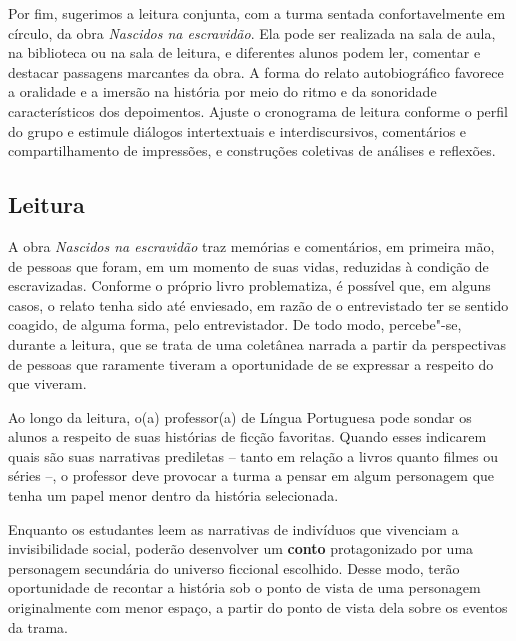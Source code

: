 \documentclass[11pt]{extarticle}
\begin{document}
Por fim, sugerimos a leitura conjunta, com a turma sentada
confortavelmente em círculo, da obra \emph{Nascidos na escravidão}. Ela
pode ser realizada na sala de aula, na biblioteca ou na sala de leitura,
e diferentes alunos podem ler, comentar e destacar passagens marcantes
da obra. A forma do relato autobiográfico favorece a oralidade e a
imersão na história por meio do ritmo e da sonoridade característicos
dos depoimentos. Ajuste o cronograma de leitura conforme o perfil do
grupo e estimule diálogos intertextuais e interdiscursivos, comentários
e compartilhamento de impressões, e construções coletivas de análises e
reflexões.

\subsection{Leitura}


A obra \emph{Nascidos na escravidão} traz memórias e
comentários, em primeira mão, de pessoas que foram, em um momento de
suas vidas, reduzidas à condição de escravizadas. Conforme o próprio
livro problematiza, é possível que, em alguns casos, o relato tenha sido
até enviesado, em razão de o entrevistado ter se sentido coagido, de
alguma forma, pelo entrevistador. De todo modo, percebe"-se, durante a
leitura, que se trata de uma coletânea narrada a partir da perspectivas
de pessoas que raramente tiveram a oportunidade de se expressar a
respeito do que viveram.


Ao longo da leitura, o(a) professor(a) de Língua Portuguesa pode sondar
os alunos a respeito de suas histórias de ficção favoritas. Quando esses
indicarem quais são suas narrativas prediletas -- tanto em relação a
livros quanto filmes ou séries --, o professor deve provocar a turma a
pensar em algum personagem que tenha um papel menor dentro da história
selecionada.

Enquanto os estudantes leem as narrativas de indivíduos que vivenciam a
invisibilidade social, poderão desenvolver um \textbf{conto}
protagonizado por uma personagem secundária do universo ficcional
escolhido. Desse modo, terão oportunidade de recontar a história sob o
ponto de vista de uma personagem originalmente com menor espaço, a
partir do ponto de vista dela sobre os eventos da trama.
\end{document}
